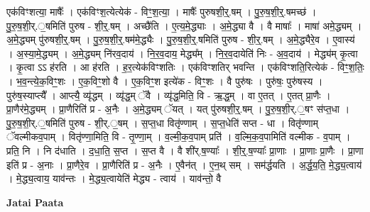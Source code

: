\documentclass[17pt]{extarticle}
\begin{document}
एक॑विꣳशत्या॒ माषैः᳚ । एक॑विꣳश॒त्येत्येक॑ - विꣳ॒॒श॒त्या॒ । माषैः᳚ पुरुषशी॒र्॒.षम् । पु॒रु॒ष॒शी॒र्॒.षमच्छ॑ । पु॒रु॒ष॒शी॒र्.॒षमिति॑ पुरुष - शी॒र्॒.षम् । अच्छै॑ति । ए॒त्य॒मे॒द्ध्याः । अ॒मे॒द्ध्या वै । वै माषाः᳚ । माषा॑ अमे॒द्ध्यम् । अ॒मे॒द्ध्यम् पु॑रुषशी॒र्॒.षम् । पु॒रु॒ष॒शी॒र्॒.षम॑मे॒द्ध्यैः । पु॒रु॒ष॒शी॒र्॒.षमिति॑ पुरुष - शी॒र्॒.षम् । अ॒मे॒द्ध्यैरे॒व । ए॒वास्य॑ । अ॒स्या॒मे॒द्ध्यम् । अ॒मे॒द्ध्यम् नि॑रव॒दाय॑ । नि॒र॒व॒दाय॒ मेद्ध्य᳚म् । नि॒र॒व॒दायेति॑ निः - अ॒व॒दाय॑ । मेद्ध्य॑म् कृ॒त्वा । कृ॒त्वा ऽऽ ह॑रति । आ ह॑रति । ह॒र॒त्येक॑विꣳशतिः । एक॑विꣳशतिर् भवन्ति । एक॑विꣳशति॒रित्येक॑ - विꣳ॒॒श॒तिः॒ । भ॒व॒न्त्ये॒क॒विꣳ॒॒शः । ए॒क॒विꣳ॒॒शो वै । ए॒क॒विꣳ॒॒श इत्ये॑क - विꣳ॒॒शः । वै पुरु॑षः । पुरु॑षः॒ पुरु॑षस्य । पुरु॑ष॒स्याप्त्यै᳚ । आप्त्यै॒ व्यृ॑द्धम् । व्यृ॑द्ध॒म् ॅवै । व्यृ॑द्ध॒मिति॒ वि - ऋ॒द्ध॒म् । वा ए॒तत् । ए॒तत् प्रा॒णैः । प्रा॒णैर॑मे॒द्ध्यम् । प्रा॒णैरिति॑ प्र - अ॒नैः । अ॒मे॒द्ध्यम् ॅयत् । यत् पु॑रुषशी॒र्॒.षम् । पु॒रु॒ष॒शी॒र्.॒षꣳ स॑प्त॒धा । पु॒रु॒ष॒शी॒र्.॒षमिति॑ पुरुष - शी॒र्.॒षम् । स॒प्त॒धा वितृ॑ण्णाम् । स॒प्त॒धेति॑ सप्त - धा । वितृ॑ण्णाम् ॅवल्मीकव॒पाम् । वितृ॑ण्णा॒मिति॒ वि - तृ॒ण्णा॒म् । व॒ल्मी॒क॒व॒पाम् प्रति॑ । व॒ल्मि॒क॒व॒पामिति॑ वल्मीक - व॒पाम् । प्रति॒ नि । नि द॑धाति । द॒धा॒ति॒ स॒प्त । स॒प्त वै । वै शी॑र्.ष॒ण्याः᳚ । शी॒र्॒.ष॒ण्याः᳚ प्रा॒णाः । प्रा॒णाः प्रा॒णैः । प्रा॒णा इति॑ प्र - अ॒नाः । प्रा॒णैरे॒व । प्रा॒णैरिति॑ प्र - अ॒नैः । ए॒वैन॑त् । ए॒न॒थ् सम् । सम॑र्द्धयति । अ॒र्द्ध॒य॒ति॒ मे॒द्ध्य॒त्वाय॑ । मे॒द्ध्य॒त्वाय॒ याव॑न्तः । मे॒द्ध्य॒त्वायेति॑ मेद्ध्य - त्वाय॑ । याव॑न्तो॒ वै \newline

\textbf{Jatai Paata} \newline
\end{document}
